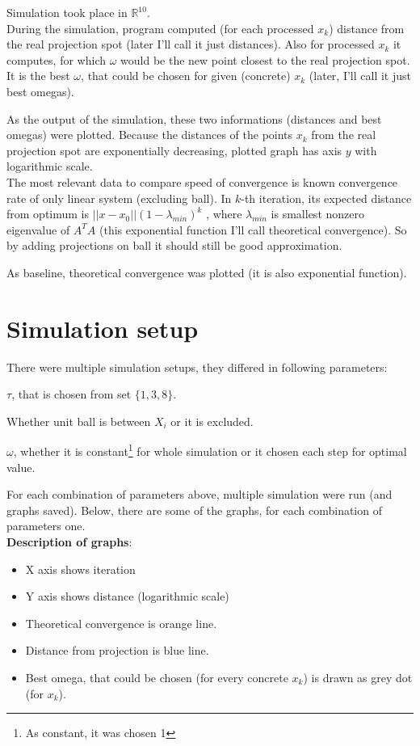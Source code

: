 \documentclass[11pt]{book}
\newcommand{\R}{\mathbb{R}}
\begin{document}
Simulation took place in $\R^{10}$.\\

During the simulation, program computed (for each processed $x_k$) distance from the real projection spot (later I'll call it just distances). Also for processed $x_k$ it computes, for which $\omega$ would be the new point closest to the real projection spot. It is the best $\omega$, that could be chosen for given (concrete) $x_k$ (later, I'll call it just best omegas).

As the output of the simulation, these two informations (distances and best omegas) were plotted. Because the distances of the points $x_k$ from the real projection spot are exponentially decreasing, plotted graph has axis $y$ with logarithmic scale.\\

The most relevant data to compare speed of convergence is known convergence rate of only linear system (excluding ball). In $k$-th iteration, its expected distance from optimum is $||x-x_0||(1-\lambda_{min})^k$ \cite{kaczmarz}, where $\lambda_{min}$ is smallest nonzero eigenvalue of $A^TA$ (this exponential function I'll call theoretical convergence). So by adding projections on ball it should still be good approximation.

As baseline, theoretical convergence was plotted (it is also exponential function).

\section{Simulation setup}

There were multiple simulation setups, they differed in following parameters:

\begin{list}{•}{}
	\item $\tau$, that is chosen from set $\{ 1, 3, 8 \}$.
	\item Whether unit ball is between $X_i$ or it is excluded.
	\item $\omega$, whether it is constant\footnote{As constant, it was chosen 1} for whole simulation or it chosen each step for optimal value.
\end{list}

For each combination of parameters above, multiple simulation were run (and graphs saved). Below, there are some of the graphs, for each combination of parameters one.\\

\newpage
\textbf{Description of graphs}:
\begin{itemize}[noitemsep]
	\item X axis shows iteration
	\item Y axis shows distance (logarithmic scale)
	\item Theoretical convergence is orange line.
	\item Distance from projection is blue line.
	\item Best omega, that could be chosen (for every concrete $x_k$) is drawn as grey dot (for $x_k$).
\end{itemize}
\end{document}
